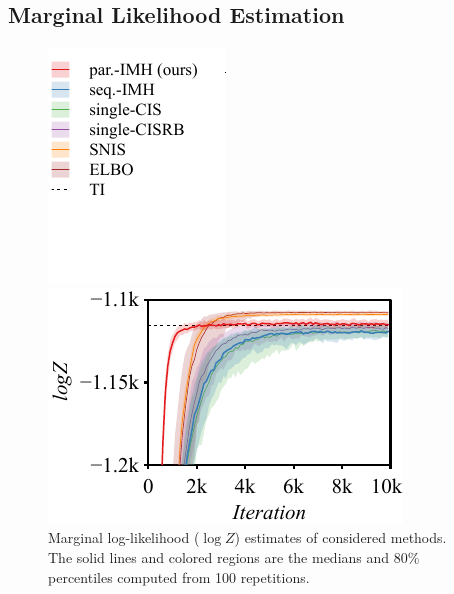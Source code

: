\subsection{Marginal Likelihood Estimation}\label{section:mll}
%
\begin{figure}[H]
  \centering
  \begin{minipage}[b]{0.3\linewidth}
    \centering
    \includegraphics[scale=0.8]{figures/radon_03.pdf}
  \end{minipage}
  \begin{minipage}[b]{0.6\linewidth}
    \centering
    \includegraphics[scale=0.8]{figures/radon_02.pdf}
  \end{minipage}
  \caption{Marginal log-likelihood (\(\log Z\)) estimates of considered methods.
    The solid lines and colored regions are the medians and 80\% percentiles computed from 100 repetitions.
  }\label{fig:marginal_likelihood}
\end{figure}
%
  \vspace{-0.05in}
